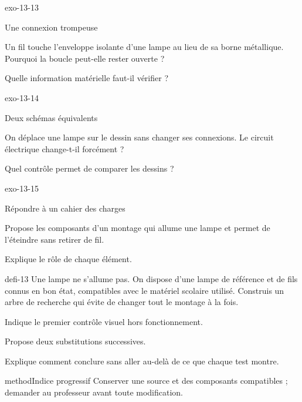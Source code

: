 \documentclass[12pt,twoside,openany]{book}
\begin{document}
\begin{blocLivre}{exo-13-13}
\begin{exercice}[3]{Une connexion trompeuse}
\begin{questions}
\item Un fil touche l’enveloppe isolante d’une lampe au lieu de sa borne métallique. Pourquoi la boucle peut-elle rester ouverte ?
\item Quelle information matérielle faut-il vérifier ?
\end{questions}
\end{exercice}\end{blocLivre}
\begin{blocLivre}{exo-13-14}
\begin{exercice}[3]{Deux schémas équivalents}
\begin{questions}
\item On déplace une lampe sur le dessin sans changer ses connexions. Le circuit électrique change-t-il forcément ?
\item Quel contrôle permet de comparer les dessins ?
\end{questions}
\end{exercice}\end{blocLivre}
\begin{blocLivre}{exo-13-15}
\begin{exercice}[3]{Répondre à un cahier des charges}
\begin{questions}
\item Propose les composants d’un montage qui allume une lampe et permet de l’éteindre sans retirer de fil.
\item Explique le rôle de chaque élément.
\end{questions}
\end{exercice}\end{blocLivre}
\label{defi-ex-13}
\begin{pcFiche}{defi-13}
Une lampe ne s’allume pas. On dispose d’une lampe de référence et de fils connus en bon état, compatibles avec le matériel scolaire utilisé. Construis un arbre de recherche qui évite de changer tout le montage à la fois.\par
{}
\begin{questions}
\item Indique le premier contrôle visuel hors fonctionnement.
\item Propose deux substitutions successives.
\item Explique comment conclure sans aller au-delà de ce que chaque test montre.
\end{questions}
\begin{pcEncadre}{method}{Indice progressif}
Conserver une source et des composants compatibles ; demander au professeur avant toute modification.\par
\end{pcEncadre}
\end{pcFiche}
\end{document}
